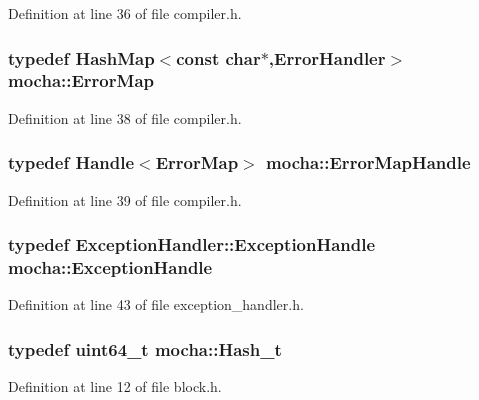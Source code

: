 Definition at line 36 of file compiler.h.

\hypertarget{namespacemocha_a47a4cccd3c5221fb912446d3dc0e5234}{
\subsubsection[{ErrorMap}]{\setlength{\rightskip}{0pt plus 5cm}typedef {\bf HashMap}$<$const char$\ast$,{\bf ErrorHandler}$>$ {\bf mocha::ErrorMap}}}
\label{namespacemocha_a47a4cccd3c5221fb912446d3dc0e5234}


Definition at line 38 of file compiler.h.

\hypertarget{namespacemocha_a8737c94f12ceeb67b4030427d00a1865}{
\subsubsection[{ErrorMapHandle}]{\setlength{\rightskip}{0pt plus 5cm}typedef {\bf Handle}$<${\bf ErrorMap}$>$ {\bf mocha::ErrorMapHandle}}}
\label{namespacemocha_a8737c94f12ceeb67b4030427d00a1865}


Definition at line 39 of file compiler.h.

\hypertarget{namespacemocha_a8220dde327ddabe54222a9f2ae2886f4}{
\subsubsection[{ExceptionHandle}]{\setlength{\rightskip}{0pt plus 5cm}typedef {\bf ExceptionHandler::ExceptionHandle} {\bf mocha::ExceptionHandle}}}
\label{namespacemocha_a8220dde327ddabe54222a9f2ae2886f4}


Definition at line 43 of file exception\_\-handler.h.

\hypertarget{namespacemocha_ac43feb383f32d7a0b18fc5866cf9ed5c}{
\subsubsection[{Hash\_\-t}]{\setlength{\rightskip}{0pt plus 5cm}typedef uint64\_\-t {\bf mocha::Hash\_\-t}}}
\label{namespacemocha_ac43feb383f32d7a0b18fc5866cf9ed5c}


Definition at line 12 of file block.h.

